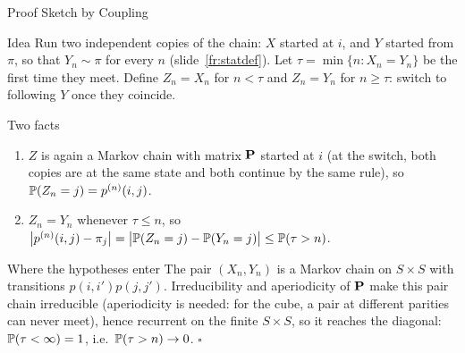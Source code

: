 \begin{frame}{Proof Sketch by Coupling}
  \label{fr:coupling}
  \small
  \begin{block}{Idea}
    Run two independent copies of the chain: $X$ started at $i$, and $Y$ started from $\pi$, so that $Y_n\sim\pi$ for every $n$ (slide~\ref{fr:statdef}). Let $\tau=\min\{n : X_n=Y_n\}$ be the first time they meet. Define $Z_n=X_n$ for $n<\tau$ and $Z_n=Y_n$ for $n\ge\tau$: switch to following $Y$ once they coincide.
  \end{block}
  \begin{block}{Two facts}
    \begin{enumerate}
      \item $Z$ is again a Markov chain with matrix $\mathbf{P}$ started at $i$ (at the switch, both copies are at the same state and both continue by the same rule), so $\mathbb{P}(Z_n=j)=p^{(n)}(i,j)$.
      \item $Z_n=Y_n$ whenever $\tau\le n$, so $\big|p^{(n)}(i,j)-\pi_j\big|=\big|\mathbb{P}(Z_n=j)-\mathbb{P}(Y_n=j)\big|\le\mathbb{P}(\tau>n)$.
    \end{enumerate}
  \end{block}
  \begin{block}{Where the hypotheses enter}
    The pair $(X_n,Y_n)$ is a Markov chain on $S\times S$ with transitions $p(i,i')p(j,j')$. Irreducibility and aperiodicity of $\mathbf{P}$ make this pair chain irreducible (aperiodicity is needed: for the cube, a pair at different parities can never meet), hence recurrent on the finite $S\times S$, so it reaches the diagonal: $\mathbb{P}(\tau<\infty)=1$, i.e.\ $\mathbb{P}(\tau>n)\to0$. \hfill$\square$
  \end{block}
\end{frame}

